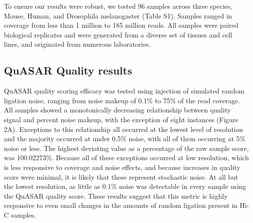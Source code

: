 To ensure our results were robust, we tested 96 samples across three species, Mouse, Human, and Drosophila melanogaster (Table S1). Samples ranged in coverage from less than 1 million to 185 million reads. All samples were paired biological replicates and were generated from a diverse set of tissues and cell lines, and originated from numerous laboratories. 

\subsection{QuASAR Quality results}

QuASAR quality scoring efficacy was tested using injection of simulated random ligation noise, ranging from noise makeup of 0.1\% to 75\% of the read coverage. All samples showed a monotonically decreasing relationship between quality signal and percent noise makeup, with the exception of eight instances (Figure 2A). Exceptions to this relationship all occurred at the lowest level of resolution and the majority occurred at under 0.5\% noise, with all of them occurring at 5\% noise or less. The highest deviating value as a percentage of the raw sample score, was 100.02273\%. Because all of these exceptions occurred at low resolution, which is less responsive to coverage and noise effects, and because increases in quality score were minimal, it is likely that these represent stochastic noise. At all but the lowest resolution, as little as 0.1\% noise was detectable in every sample using the QuASAR quality score. These results suggest that this metric is highly responsive to even small changes in the amounts of random ligation present in Hi-C samples.


